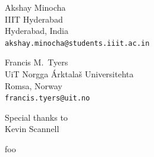 \documentclass[a0paper,fontscale=0.3]{baposter}  %
\begin{document}
\begin{poster}
{			\vspace{-0.5em}
			\begin{center}
			{\begin{minipage}[t]{11.2em}
				\begin{spacing}{0.4}
					{Akshay Minocha}\\
					{\footnotesize IIIT Hyderabad\\Hyderabad, India\\\texttt{akshay.minocha@students.iiit.ac.in}}
				\end{spacing}
			\end{minipage}
			\begin{minipage}[t]{10.5em}
				\begin{spacing}{0.4}
					{Francis M.\ Tyers}\\
					{\footnotesize UiT Norgga Árktalaš Universitehta \\Romsa, Norway\\\texttt{francis.tyers@uit.no}}
				\end{spacing}
			\end{minipage}}
			\begin{minipage}[t]{5.5em}
				\vspace{-0.25em}
				\begin{spacing}{0.4}
					{\footnotesize Special thanks to}\\
					{\small Kevin Scannell}\\
				\end{spacing}
			\end{minipage}
			\end{center}
		}{
			foo
		}
	

\end{poster}
\end{document}
